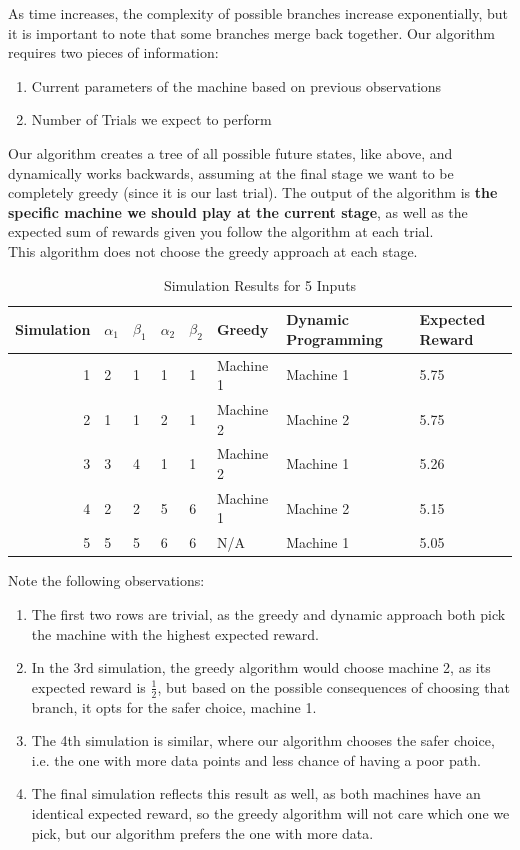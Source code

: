 \documentclass{article}
\begin{document}
As time increases, the complexity of possible branches increase exponentially, but it is important to note that some branches merge back together. Our algorithm requires two pieces of information:

\begin{enumerate}
\item Current parameters of the machine based on previous observations
\item Number of Trials we expect to perform
\end{enumerate}

Our algorithm creates a tree of all possible future states, like above, and dynamically works backwards, assuming at the final stage we want to be completely greedy (since it is our last trial). The output of the algorithm is \textbf{the specific machine we should play at the current stage}, as well as the expected sum of rewards given you follow the algorithm at each trial.\\

This algorithm does not choose the greedy approach at each stage.

\begin{table}[ht]
\centering
\begin{tabular}{rlllllll}
  \hline
 Simulation & $\alpha_1$ & $\beta_1$ & $\alpha_2$ & $\beta_2$ & Greedy & Dynamic Programming & Expected Reward \\ 
  \hline
   1 & 2 & 1 & 1 & 1 & Machine 1 & Machine 1 & 5.75 \\ 
   2 & 1 & 1 & 2 & 1 & Machine 2 & Machine 2 & 5.75 \\ 
   3 & 3 & 4 & 1 & 1 & Machine 2 & Machine 1 & 5.26 \\ 
   4 & 2 & 2 & 5 & 6 & Machine 1 & Machine 2 & 5.15 \\ 
   5 & 5 & 5 & 6 & 6 & N/A & Machine 1 & 5.05 \\ 
   \hline
\end{tabular}
\caption{Simulation Results for 5 Inputs}
\end{table}

Note the following observations:

\begin{enumerate}
\item The first two rows are trivial, as the greedy and dynamic approach both pick the machine with the highest expected reward. 
\item In the 3rd simulation, the greedy algorithm would choose machine 2, as its expected reward is $\frac{1}{2}$, but based on the possible consequences of choosing that branch, it opts for the safer choice, machine 1. 
\item The 4th simulation is similar, where our algorithm chooses the safer choice, i.e. the one with more data points and less chance of having a poor path. 
\item The final simulation reflects this result as well, as both machines have an identical expected reward, so the greedy algorithm will not care which one we pick, but our algorithm prefers the one with more data.
\end{enumerate}
\end{document}
